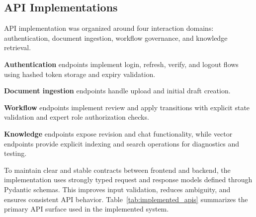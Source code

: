 \subsection{API Implementations}

API implementation was organized around four interaction domains: authentication, document ingestion, workflow governance, and knowledge retrieval.

\textbf{Authentication} endpoints implement login, refresh, verify, and logout flows using hashed token storage and expiry validation.

\textbf{Document ingestion} endpoints handle upload and initial draft creation.

\textbf{Workflow} endpoints implement review and apply transitions with explicit state validation and expert role authorization checks.

\textbf{Knowledge} endpoints expose revision and chat functionality, while vector endpoints provide explicit indexing and search operations for diagnostics and testing.

To maintain clear and stable contracts between frontend and backend, the implementation uses strongly typed request and response models defined through Pydantic schemas\cite{Pydantic_schemas}.
This improves input validation, reduces ambiguity, and ensures consistent API behavior.  
Table~\ref{tab:implemented_apis} summarizes the primary API surface used in the implemented system.

